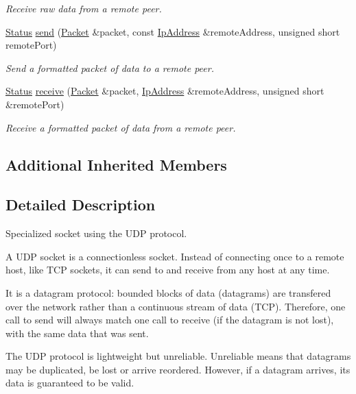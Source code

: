 \begin{DoxyCompactItemize}
\begin{DoxyCompactList}\small\item\em Receive raw data from a remote peer. \end{DoxyCompactList}\item 
\hyperlink{classsf_1_1_socket_a51bf0fd51057b98a10fbb866246176dc}{Status} \hyperlink{classsf_1_1_udp_socket_a48969a62c80d40fd74293a740798e435}{send} (\hyperlink{classsf_1_1_packet}{Packet} \&packet, const \hyperlink{classsf_1_1_ip_address}{Ip\+Address} \&remote\+Address, unsigned short remote\+Port)
\begin{DoxyCompactList}\small\item\em Send a formatted packet of data to a remote peer. \end{DoxyCompactList}\item 
\hyperlink{classsf_1_1_socket_a51bf0fd51057b98a10fbb866246176dc}{Status} \hyperlink{classsf_1_1_udp_socket_afdd5c655d00c96222d5b477fc057a22b}{receive} (\hyperlink{classsf_1_1_packet}{Packet} \&packet, \hyperlink{classsf_1_1_ip_address}{Ip\+Address} \&remote\+Address, unsigned short \&remote\+Port)
\begin{DoxyCompactList}\small\item\em Receive a formatted packet of data from a remote peer. \end{DoxyCompactList}\end{DoxyCompactItemize}
\subsection*{Additional Inherited Members}


\subsection{Detailed Description}
Specialized socket using the U\+D\+P protocol. 

A U\+D\+P socket is a connectionless socket. Instead of connecting once to a remote host, like T\+C\+P sockets, it can send to and receive from any host at any time.

It is a datagram protocol\+: bounded blocks of data (datagrams) are transfered over the network rather than a continuous stream of data (T\+C\+P). Therefore, one call to send will always match one call to receive (if the datagram is not lost), with the same data that was sent.

The U\+D\+P protocol is lightweight but unreliable. Unreliable means that datagrams may be duplicated, be lost or arrive reordered. However, if a datagram arrives, its data is guaranteed to be valid.

